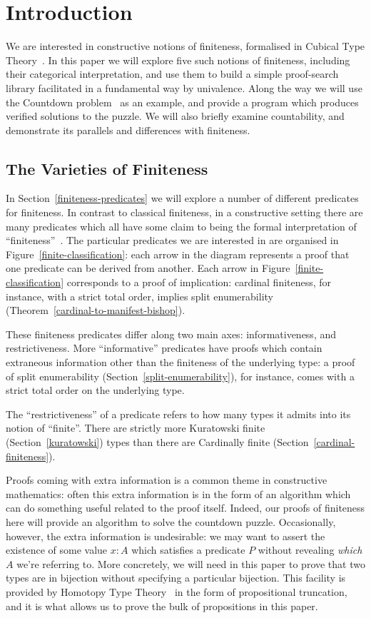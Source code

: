 \chapter{Introduction}
We are interested in constructive notions of finiteness, formalised in Cubical
Type Theory~\cite{cohenCubicalTypeTheory2016}.
In this paper we will explore five such notions of finiteness, including their
categorical interpretation, and use them to build a simple proof-search library
facilitated in a fundamental way by univalence.
Along the way we will use the Countdown
problem~\cite{huttonCountdownProblem2002} as an example, and provide a program
which produces verified solutions to the puzzle.
We will also briefly examine countability, and demonstrate its parallels and
differences with finiteness.
\section{The Varieties of Finiteness}
In Section~\ref{finiteness-predicates} we will explore a number of different
predicates for finiteness.
In contrast to classical finiteness, in a constructive setting there are many
predicates which all have some claim to being the formal interpretation of
``finiteness''~\cite{coquandConstructivelyFinite2010}.
The particular predicates we are interested in are organised in
Figure~\ref{finite-classification}: each arrow in the diagram represents a proof
that one predicate can be derived from another.
Each arrow in Figure~\ref{finite-classification} corresponds to a proof of
implication: cardinal finiteness, for instance, with a strict total order,
implies split enumerability (Theorem~\ref{cardinal-to-manifest-bishop}).



These finiteness predicates differ along two main axes: informativeness, and
restrictiveness.
More ``informative'' predicates have proofs which contain extraneous information
other than the finiteness of the underlying type: a proof of split enumerability
(Section~\ref{split-enumerability}), for instance, comes with a strict total
order on the underlying type.

The ``restrictiveness'' of a predicate refers to how many types it admits into
its notion of ``finite''.
There are strictly more Kuratowski finite (Section~\ref{kuratowski}) types than
there are Cardinally finite (Section~\ref{cardinal-finiteness}).

Proofs coming with extra information is a common theme in constructive
mathematics: often this extra information is in the form of an algorithm which
can do something useful related to the proof itself.
Indeed, our proofs of finiteness here will provide an algorithm to solve the
countdown puzzle.
Occasionally, however, the extra information is undesirable: we may want to
assert the existence of some value \(x : A\) which satisfies a predicate \(P\)
without revealing \emph{which} \(A\) we're referring to.
More concretely, we will need in this paper to prove that two types are in
bijection without specifying a particular bijection.
This facility is provided by Homotopy Type Theory~\cite{hottbook} in the form of
propositional truncation, and it is what allows us to prove the bulk of
propositions in this paper.

